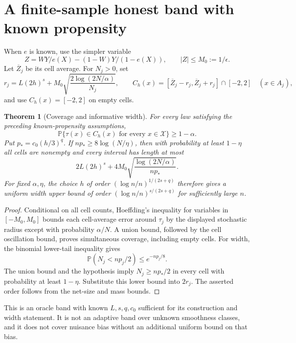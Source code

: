 \documentclass[11pt,a4paper]{article}
\newtheorem{theorem}{Theorem}[section]
\theoremstyle{definition}
\theoremstyle{remark}
\newcommand{\Prb}{\mathbb P}
\begin{document}
\section{A finite-sample honest band with known propensity}
When $e$ is known, use the simpler variable
\[
 Z=WY/e(X)-(1-W)Y/(1-e(X)),\qquad |Z|\leq M_0:=1/\epsilon.
\]
Let $\overline Z_j$ be its cell average. For $N_j>0$, set
\[
 r_j=L(2h)^s+M_0\sqrt{\frac{2\log(2N/\alpha)}{N_j}},\qquad
 C_h(x)=[\overline Z_j-r_j,\overline Z_j+r_j]\cap[-2,2]
 \quad(x\in A_j),
\]
and use $C_h(x)=[-2,2]$ on empty cells.

\begin{theorem}[Coverage and informative width]\label{th:band}
For every law satisfying the preceding known-propensity assumptions,
\[
 \Prb\{\tau(x)\in C_h(x)\text{ for every }x\in\mathcal X\}\geq1-\alpha.
\]
Put $p_*=c_0(h/3)^q$. If $np_*\geq8\log(N/\eta)$, then with probability at least $1-\eta$ all cells are nonempty and every interval has length at most
\[
 2L(2h)^s+4M_0\sqrt{\frac{\log(2N/\alpha)}{np_*}}.
\]
For fixed $\alpha,\eta$, the choice $h$ of order $(\log n/n)^{1/(2s+q)}$ therefore gives a uniform width upper bound of order $(\log n/n)^{s/(2s+q)}$ for sufficiently large $n$.
\end{theorem}
\begin{proof}
Conditional on all cell counts, Hoeffding's inequality for variables in $[-M_0,M_0]$ bounds each cell-average error around $\tau_j$ by the displayed stochastic radius except with probability $\alpha/N$. A union bound, followed by the cell oscillation bound, proves simultaneous coverage, including empty cells. For width, the binomial lower-tail inequality gives
\[
 \Prb(N_j<np_j/2)\leq e^{-np_j/8}.
\]
The union bound and the hypothesis imply $N_j\geq np_*/2$ in every cell with probability at least $1-\eta$. Substitute this lower bound into $2r_j$. The asserted order follows from the net-size and mass bounds.
\end{proof}

This is an oracle band with known $L,s,q,c_0$ sufficient for its construction and width statement. It is not an adaptive band over unknown smoothness classes, and it does not cover nuisance bias without an additional uniform bound on that bias.
\end{document}
